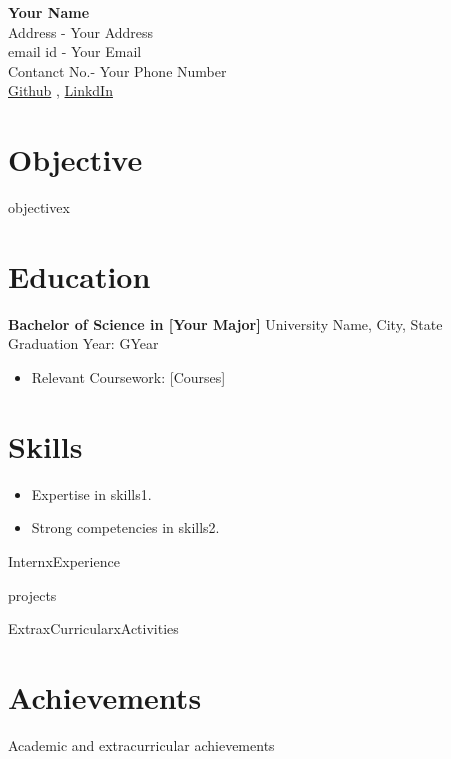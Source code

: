 \documentclass[a4paper,10pt]{article}
\newcommand{\resitem}[2]{
    \textbf{#1} \hfill {#2} \\
}
\begin{document}
\begin{center}
    {\LARGE \textbf{Your Name}} \\[0.2cm]
    Address - Your Address \\
    email id - Your Email \\
    Contanct No.-  Your Phone Number \\
    \href{https://github.com/Github Profile}{Github} , \href{https://www.linkedin.com/in/LinkedIn Profile}{LinkdIn}
\end{center}

\section*{Objective}
objectivex


\section*{Education}
\resitem{Bachelor of Science in [Your Major]}{University Name, City, State \\ Graduation Year: GYear}
\begin{itemize}[left=0pt]
    \item Relevant Coursework: [Courses]
\end{itemize}

\section*{Skills}
\begin{itemize}
    \item Expertise in skills1.
    \item Strong competencies in skills2.
\end{itemize}

InternxExperience

projects

ExtraxCurricularxActivities

\section*{Achievements}
Academic and extracurricular achievements
\end{document}
